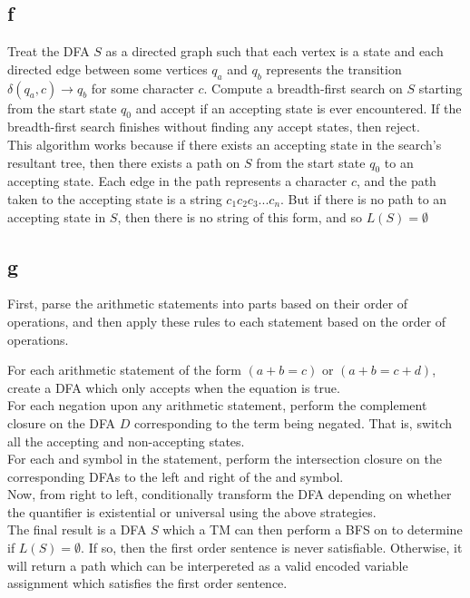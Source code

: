 \documentclass[letterpaper,notitlepage,twoside]{article}
\begin{document}
\subsection*{f}
Treat the DFA $S$ as a directed graph such that each vertex is a state and each directed edge between some vertices $q_a$ and $q_b$ represents the transition $\delta(q_a, c) \rightarrow q_b$ for some character $c$. Compute a breadth-first search on $S$ starting from the start state $q_0$ and accept if an accepting state is ever encountered. If the breadth-first search finishes without finding any accept states, then reject. \\

This algorithm works because if there exists an accepting state in the search's resultant tree, then there exists a path on $S$ from the start state $q_0$ to an accepting state. Each edge in the path represents a character $c$, and the path taken to the accepting state is a string $c_1c_2c_3...c_n$. But if there is no path to an accepting state in $S$, then there is no string of this form, and so $L(S) = \emptyset$
\subsection*{g}
First, parse the arithmetic statements into parts based on their order of operations, and then apply these rules to each statement based on the order of operations.

For each arithmetic statement of the form $(a + b = c)$ or $(a + b = c + d)$, create a DFA which only accepts when the equation is true. \\

For each negation upon any arithmetic statement, perform the complement closure on the DFA $D$ corresponding to the term being negated. That is, switch all the accepting and non-accepting states. \\

For each and symbol in the statement, perform the intersection closure on the corresponding DFAs to the left and right of the and symbol. \\

Now, from right to left, conditionally transform the DFA depending on whether the quantifier is existential or universal using the above strategies. \\

The final result is a DFA $S$ which a TM can then perform a BFS on to determine if $L(S) = \emptyset$. If so, then the first order sentence is never satisfiable. Otherwise, it will return a path which can be interpereted as a valid encoded variable assignment which satisfies the first order sentence. \\
\end{document}
